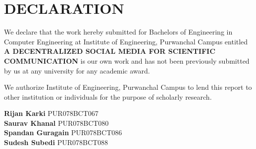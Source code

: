 \chapter*{DECLARATION}
We declare that the work hereby submitted for Bachelors of Engineering in Computer Engineering at Institute of Engineering, Purwanchal Campus entitled \textbf{A DECENTRALIZED SOCIAL MEDIA FOR SCIENTIFIC COMMUNICATION} is our own work and has not been previously submitted by us at any university for any academic award.

We authorize Institute of Engineering, Purwanchal Campus to lend this report to other institution or individuals for the purpose of scholarly research.


\vspace{1cm}
\textbf{Rijan Karki} 
PUR078BCT067\\
\textbf{Saurav Khanal} 
PUR078BCT080\\
\textbf{Spandan Guragain} 
PUR078BCT086\\
\textbf{Sudesh Subedi} 
PUR078BCT088\\
